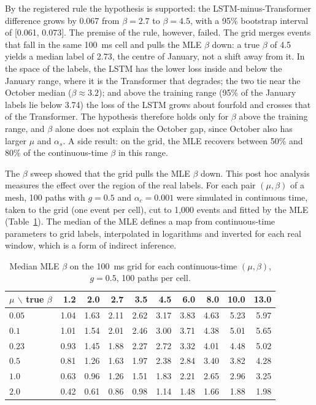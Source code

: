 By the registered rule the hypothesis is supported: the LSTM-minus-Transformer difference
grows by 0.067 from $\beta=2.7$ to $\beta=4.5$, with a 95\% bootstrap interval
of [0.061, 0.073]. The premise of the rule, however, failed. The grid merges events that fall in
the same 100~ms cell and pulls the MLE $\beta$ down: a true $\beta$ of 4.5 yields a median
label of 2.73, the centre of January, not a shift
away from it. In the space of the labels, the LSTM has the
lower loss inside and below the January range, where it is the Transformer that degrades;
the two tie near the October median ($\beta \approx 3.2$); and above the training range
(95\% of the January labels lie below 3.74) the loss of the LSTM grows about fourfold and
crosses that of the Transformer. The hypothesis therefore holds only for $\beta$ above the
training range, and $\beta$ alone does not explain the October gap, since October also has
larger $\mu$ and $\alpha_s$. A side result: on the grid, the MLE recovers between 50\% and
80\% of the continuous-time $\beta$ in this range.


\label{sec:addendum-grid}

The $\beta$ sweep showed that the grid pulls the MLE $\beta$ down. This post hoc analysis
measures the effect over the region of the real labels. For each pair $(\mu,\beta)$ of a
mesh, 100 paths with $g=0.5$ and
$\alpha_c=0.001$ were simulated in continuous time, taken to the grid
(one event per cell), cut to 1,000 events and fitted by the MLE
(Table~\ref{tab:addendum-grid}). The median of the MLE defines a map from continuous-time
parameters to grid labels, interpolated in logarithms and inverted for each real window,
which is a form of indirect inference.

\begin{table}[htbp]
\centering
\caption{Median MLE $\beta$ on the 100~ms grid for each continuous-time $(\mu,\beta)$,
$g=0.5$, 100 paths per cell.}
\label{tab:addendum-grid}
\small
\begin{tabular}{lrrrrrrrrr}
\toprule
$\mu$ $\backslash$ true $\beta$ & 1.2 & 2.0 & 2.7 & 3.5 & 4.5 & 6.0 & 8.0 & 10.0 & 13.0 \\
\midrule
$0.05$ & 1.04 & 1.63 & 2.11 & 2.62 & 3.17 & 3.83 & 4.63 & 5.23 & 5.97 \\
$0.1$ & 1.01 & 1.54 & 2.01 & 2.46 & 3.00 & 3.71 & 4.38 & 5.01 & 5.65 \\
$0.23$ & 0.93 & 1.45 & 1.88 & 2.27 & 2.72 & 3.32 & 4.01 & 4.48 & 5.02 \\
$0.5$ & 0.81 & 1.26 & 1.63 & 1.97 & 2.38 & 2.84 & 3.40 & 3.82 & 4.28 \\
$1.0$ & 0.63 & 0.96 & 1.26 & 1.51 & 1.83 & 2.21 & 2.65 & 2.96 & 3.25 \\
$2.0$ & 0.42 & 0.61 & 0.86 & 0.98 & 1.14 & 1.48 & 1.66 & 1.88 & 1.98 \\
\bottomrule
\end{tabular}
\end{table}

